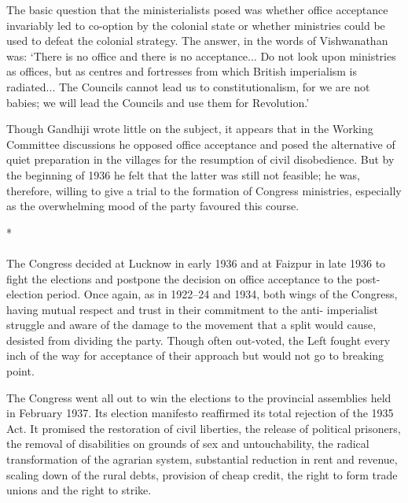 The basic question that the ministerialists posed was whether office acceptance invariably led to co-option by the colonial state or whether ministries could be used to defeat the colonial strategy. The answer, in the words of Vishwanathan was: `There is no office and there is no acceptance... Do not look upon ministries as offices, but as centres and fortresses from which British imperialism is radiated... The Councils cannot lead us to constitutionalism, for we are not babies; we will lead the Councils and use them for Revolution.' 

Though Gandhiji wrote little on the subject, it appears that in the Working Committee discussions he opposed office acceptance and posed the alternative of quiet preparation in the villages for the resumption of civil disobedience. But by the beginning of 1936 he felt that the latter was still not feasible; he was, therefore, willing to give a trial to the formation of Congress ministries, especially as the overwhelming mood of the party favoured this course.

\begin{center}*\end{center}

\paragraph*{}


The Congress decided at Lucknow in early 1936 and at Faizpur in late 1936 to fight the elections and postpone the decision on office acceptance to the post-election period. Once again, as in 1922--24 and 1934, both wings of the Congress, having mutual respect and trust in their commitment to the anti- imperialist struggle and aware of the damage to the movement that a split would cause, desisted from dividing the party. Though often out-voted, the Left fought every inch of the way for acceptance of their approach but would not go to breaking point. 

The Congress went all out to win the elections to the provincial assemblies held in February 1937. Its election manifesto reaffirmed its total rejection of the 1935 Act. It promised the restoration of civil liberties, the release of political prisoners, the removal of disabilities on grounds of sex and untouchability, the radical transformation of the agrarian system, substantial reduction in rent and revenue, scaling down of the rural debts, provision of cheap credit, the right to form trade unions and the right to strike. 

